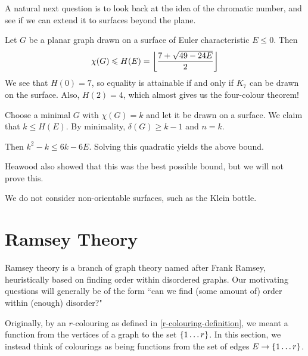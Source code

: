 \documentclass{article}
\begin{document}
A natural next question is to look back at the idea of the chromatic number, and see if we can extend it to surfaces beyond the plane.

\begin{theorem}
    Let $G$ be a planar graph drawn on a surface of Euler characteristic $E \leq 0$. Then
    \[
	\chi(G) \leqslant H(E) = \left\lfloor\frac{7 + \sqrt{49 - 24E}}{2}\right\rfloor
	\]
	We see that $H(0) = 7$, so equality is attainable if and only if $K_7$ can be drawn on the surface. Also, $H(2) = 4$, which almost gives us the four-colour theorem!
\end{theorem}

\begin{prf}
    Choose a minimal $G$ with $\chi(G) = k$ and let it be drawn on a surface. We claim that $k \leq H(E)$. By minimality, $\delta(G) \geq k-1$ and $n = k$.
    
    Then $k^2 - k \leq 6k - 6E$. Solving this quadratic yields the above bound. 
\end{prf}

\begin{note}
	Heawood also showed that this was the best possible bound, but we will not prove this.
\end{note}

\begin{note}
	We do not consider non-orientable surfaces, such as the Klein bottle.
\end{note}

\pagebreak
\section{Ramsey Theory}

Ramsey theory is a branch of graph theory named after Frank Ramsey, heuristically based on finding order within disordered graphs. Our motivating questions will generally be of the form ``can we find (some amount of) order within (enough) disorder?"

Originally, by an $r$-colouring as defined in \ref{r-colouring-definition}, we meant a function from the vertices of a graph to the set $\left\lbrace 1 \dots r \right\rbrace$. In this section, we instead think of colourings as being functions from the set of edges $E \to \left\lbrace 1 \dots r \right\rbrace$.
\end{document}

